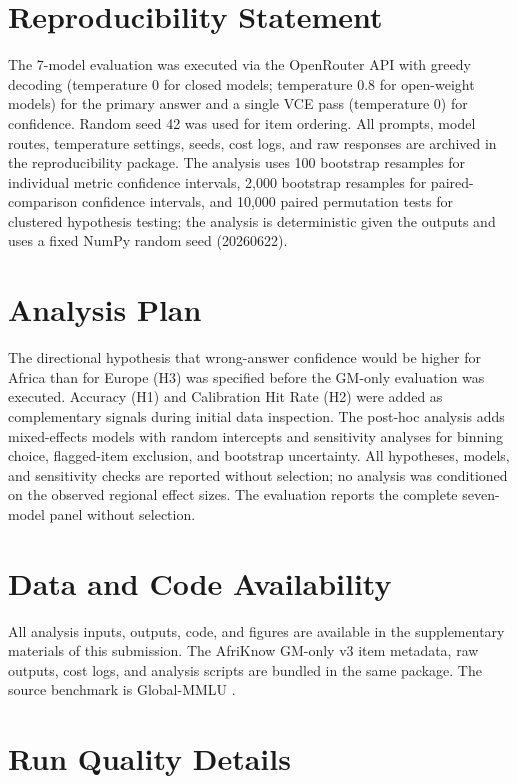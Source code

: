 \documentclass[11pt]{article}
\begin{document}
\section{Reproducibility Statement}

The 7-model evaluation was executed via the OpenRouter API with greedy decoding (temperature 0 for closed models; temperature 0.8 for open-weight models) for the primary answer and a single VCE pass (temperature 0) for confidence. Random seed 42 was used for item ordering. All prompts, model routes, temperature settings, seeds, cost logs, and raw responses are archived in the reproducibility package. The analysis uses 100 bootstrap resamples for individual metric confidence intervals, 2,000 bootstrap resamples for paired-comparison confidence intervals, and 10,000 paired permutation tests for clustered hypothesis testing; the analysis is deterministic given the outputs and uses a fixed NumPy random seed (20260622).

\section{Analysis Plan}

The directional hypothesis that wrong-answer confidence would be higher for Africa than for Europe (H3) was specified before the GM-only evaluation was executed. Accuracy (H1) and Calibration Hit Rate (H2) were added as complementary signals during initial data inspection. The post-hoc analysis adds mixed-effects models with random intercepts and sensitivity analyses for binning choice, flagged-item exclusion, and bootstrap uncertainty. All hypotheses, models, and sensitivity checks are reported without selection; no analysis was conditioned on the observed regional effect sizes. The evaluation reports the complete seven-model panel without selection.

\section{Data and Code Availability}

All analysis inputs, outputs, code, and figures are available in the supplementary materials of this submission. The AfriKnow GM-only v3 item metadata, raw outputs, cost logs, and analysis scripts are bundled in the same package. The source benchmark is Global-MMLU \cite{singh2025global}.

\section{Run Quality Details}
\label{app:runquality}
\end{document}
